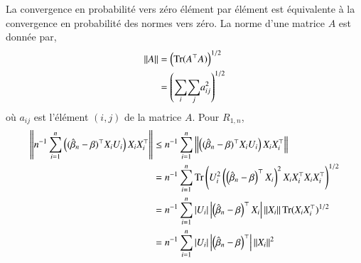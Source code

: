 \documentclass[10pt, reqno]{amsart}
\begin{document}
La convergence en probabilité vers zéro élément par élément est équivalente à la convergence en probabilité des normes vers zéro. La norme d'une matrice $A$ est donnée par,
\begin{align*}
\left\Vert {A} \right\Vert& = \left(\operatorname{Tr}(A^\top A)\right)^{1/2}\\
&= \left(\underset{i}{\sum}\underset{j}{\sum}a_{ij}^2\right)^{1/2}
\end{align*}
où $a_{ij}$ est l'élément $(i, j)$ de la matrice $A$. Pour $R_{1,n}$,
\begin{align*}
\left\Vert {n^{-1}\sum_{i=1}^n\left((\hat{\beta}_n- \beta)^\top X_iU_i\right)X_iX_i^\top} \right\Vert &\leq 
n^{-1} \sum_{i=1}^n \left\Vert {\left((\hat{\beta}_n- \beta)^\top X_iU_i\right)X_iX_i^\top} \right\Vert\\
 &= n^{-1} \sum_{i=1}^n \operatorname{Tr}\left(U_i^2\left(\left(\hat{\beta}_n- \beta\right)^\top X_i\right)^2 X_iX_i^\top X_iX_i^\top\right)^{1/2}\\
 &=n^{-1} \sum_{i=1}^n \left\vert {U_i} \right\vert\left\vert {\left(\hat{\beta}_n- \beta\right)^\top X_i} \right\vert\left\Vert {X_i} \right\Vert\operatorname{Tr}(X_iX_i^\top)^{1/2} \\
 &=n^{-1}\sum_{i=1}^n \left\vert {U_i} \right\vert\left\vert {\left(\hat{\beta}_n- \beta\right)^\top} \right\vert\left\Vert {X_i} \right\Vert^2
\end{align*}
\end{document}
